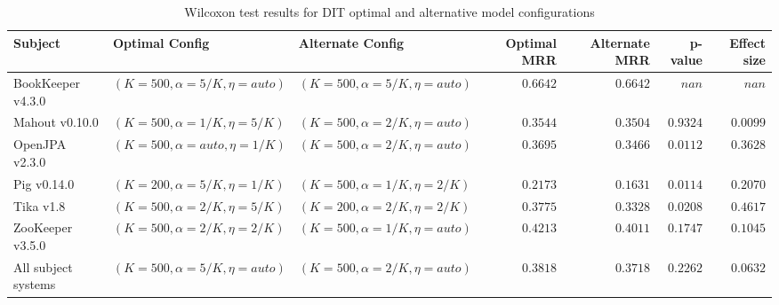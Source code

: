\begin{landscape}
\begin{table}
\begin{spacing}{1.2}
\centering
\caption{Wilcoxon test results for DIT optimal and alternative model configurations}
\label{table:combo-dit-model-sweep-wilcox}
\begin{tabular}{lllrrrr}
\toprule
                      Subject &                    Optimal Config &                  Alternate Config & Optimal MRR & Alternate MRR &  p-value & Effect size \\
\midrule
            BookKeeper v4.3.0 &  $(K=500, \alpha=5/K, \eta=auto)$ &  $(K=500, \alpha=5/K, \eta=auto)$ &    $0.6642$ &      $0.6642$ &    $nan$ &       $nan$ \\
               Mahout v0.10.0 &   $(K=500, \alpha=1/K, \eta=5/K)$ &  $(K=500, \alpha=2/K, \eta=auto)$ &    $0.3544$ &      $0.3504$ & $0.9324$ &    $0.0099$ \\
               OpenJPA v2.3.0 &  $(K=500, \alpha=auto, \eta=1/K)$ &  $(K=500, \alpha=2/K, \eta=auto)$ &    $0.3695$ &      $0.3466$ & $0.0112$ &    $0.3628$ \\
                  Pig v0.14.0 &   $(K=200, \alpha=5/K, \eta=1/K)$ &   $(K=500, \alpha=1/K, \eta=2/K)$ &    $0.2173$ &      $0.1631$ & $0.0114$ &    $0.2070$ \\
                    Tika v1.8 &   $(K=500, \alpha=2/K, \eta=5/K)$ &   $(K=200, \alpha=2/K, \eta=2/K)$ &    $0.3775$ &      $0.3328$ & $0.0208$ &    $0.4617$ \\
             ZooKeeper v3.5.0 &   $(K=500, \alpha=2/K, \eta=2/K)$ &  $(K=500, \alpha=1/K, \eta=auto)$ &    $0.4213$ &      $0.4011$ & $0.1747$ &    $0.1045$ \\
 \midrule
All subject systems &  $(K=500, \alpha=5/K, \eta=auto)$ &  $(K=500, \alpha=2/K, \eta=auto)$ &    $0.3818$ &      $0.3718$ & $0.2262$ &    $0.0632$ \\
\bottomrule
\end{tabular}

\end{spacing}
\end{table}

\end{landscape}
